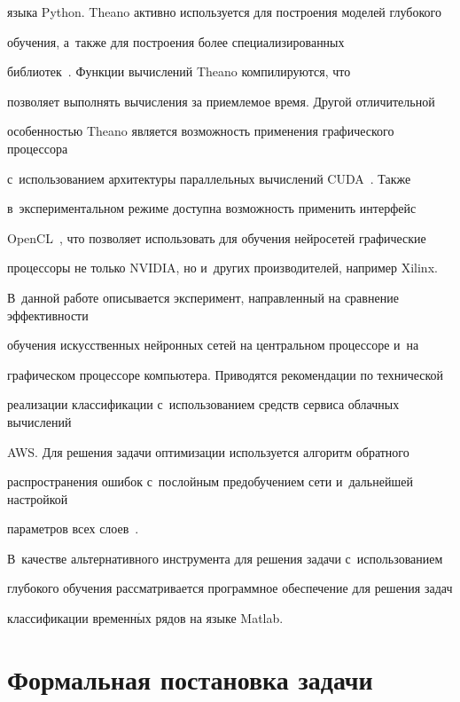 языка Python. Theano активно используется для построения моделей глубокого 


обучения, а~также для построения более специализированных 


библиотек~\cite{pylearn, lasagne}. Функции вычислений Theano компилируются, что 


позволяет выполнять вычисления за приемлемое время. Другой отличительной 


особенностью Theano является возможность применения графического процессора 


с~использованием архитектуры параллельных вычислений CUDA~\cite{cuda}. Также 


в~экспериментальном режиме доступна возможность применить интерфейс 


OpenCL~\cite{cl}, что позволяет использовать для обучения нейросетей графические 


процессоры не только NVIDIA, но и~других производителей, например Xilinx. 


%


В~данной работе описывается эксперимент, направленный на сравнение эффективности 


обучения искусственных нейронных сетей на центральном процессоре и~на 


графическом процессоре компьютера. Приводятся рекомендации по технической 


реализации классификации с~использованием средств сервиса облачных вычислений 


AWS. Для решения задачи оптимизации используется алгоритм обратного 


распространения ошибок с~послойным предобучением сети и~дальнейшей настройкой 


параметров всех слоев~\cite{fine}.


%


В~качестве альтернативного инструмента для решения задачи с~использованием 


глубокого обучения рассматривается программное обеспечение для решения задач 


классификации временн$\acute{\mbox{ы}}$х рядов на языке Matlab.










\section{Формальная постановка задачи}





